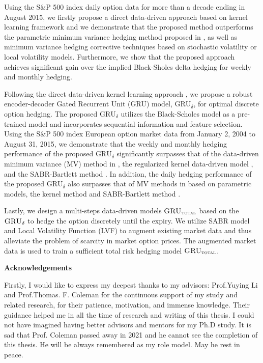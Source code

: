 Using the S\&P 500 index daily option data for more than a decade ending in August 2015, we firstly propose a direct data-driven approach \citep{knian2017} based on kernel learning framework and we demonstrate  that the proposed method outperforms the parametric minimum variance hedging method proposed in \citep{hulloptimal}, as well as  minimum variance hedging corrective techniques based on stochastic volatility or local volatility models.
Furthermore, we show that the proposed approach achieves significant gain over the implied Black-Sholes delta hedging for weekly and monthly hedging.

Following the direct data-driven kernel learning approach \citep{knian2017}, we propose a robust encoder-decoder  Gated Recurrent Unit (GRU) model, $\text{GRU}_{\delta}$, for optimal discrete option hedging. The proposed $\text{GRU}_{\delta}$ utilizes the Black-Scholes model as a pre-trained model and  incorporates sequential information and feature selection.  Using the S\&P 500 index European option market data from January 2, 2004 to August 31, 2015,   we demonstrate that the weekly and monthly hedging performance of the proposed $\text{GRU}_{\delta}$ significantly surpasses that of the data-driven minimum variance (MV) method in \citep{hulloptimal}, the regularized kernel data-driven model \citep{knian2017}, and the SABR-Bartlett method \cite{hagan2017bartlett}.
In addition, the daily hedging performance of the proposed $\text{GRU}_{\delta}$ also surpasses that of MV methods in \cite{hulloptimal} based on parametric models, the kernel method \citep{knian2017} and SABR-Bartlett method \cite{hagan2017bartlett}.

Lastly, we design a multi-steps data-driven models $\textsc{GRU}_{\textsc{total}}$ based on the $\textsc{GRU}_\delta$  to hedge the option discretely until the expiry.  We utilize SABR model and Local Volatility Function (LVF) to augment existing market data and thus alleviate the problem of  scarcity in market option prices. The augmented market data is used to train a sufficient  total risk hedging model $\textsc{GRU}_{\textsc{total}}$.
\cleardoublepage


\begin{center}\textbf{Acknowledgements}\end{center}

Firstly, I would like to express my deepest thanks to my advisors: Prof.Yuying Li and Prof.Thomas. F. Coleman for the continuous support of my study and related research, for their patience, motivation, and immense knowledge. Their guidance helped me in all the time of research and writing of this thesis. I could not have imagined having  better advisors and mentors for my Ph.D study. It is sad that Prof. Coleman passed away in 2021 and he cannot see the completion of this thesis. He will be always remembered as my role model. May he rest in peace.  

